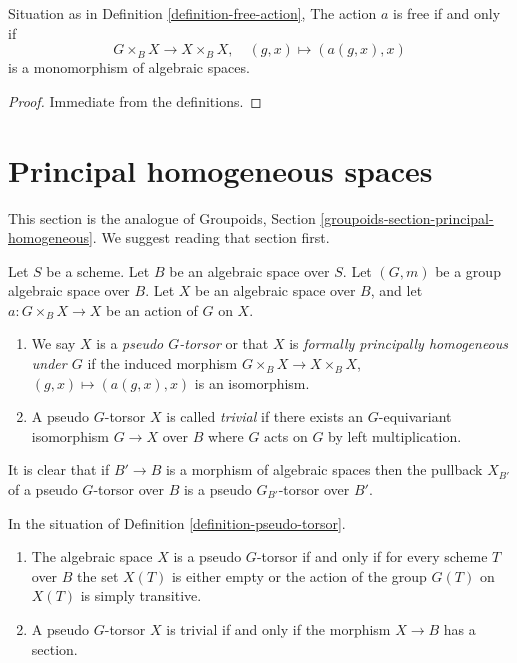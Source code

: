 \begin{lemma}
\label{lemma-free-action}
Situation as in
Definition \ref{definition-free-action},
The action $a$ is free if and only if
$$
G \times_B X \to X \times_B X,\quad (g, x) \mapsto (a(g, x), x)
$$
is a monomorphism of algebraic spaces.
\end{lemma}

\begin{proof}
Immediate from the definitions.
\end{proof}









\section{Principal homogeneous spaces}
\label{section-principal-homogeneous}

\noindent
This section is the analogue of
Groupoids, Section \ref{groupoids-section-principal-homogeneous}.
We suggest reading that section first.

\begin{definition}
\label{definition-pseudo-torsor}
Let $S$ be a scheme. Let $B$ be an algebraic space over $S$.
Let $(G, m)$ be a group algebraic space over $B$.
Let $X$ be an algebraic space over $B$, and let
$a : G \times_B X \to X$ be an action of $G$ on $X$.
\begin{enumerate}
\item We say $X$ is a {\it pseudo $G$-torsor} or that $X$ is
{\it formally principally homogeneous under $G$} if the induced
morphism $G \times_B X \to X \times_B X$,
$(g, x) \mapsto (a(g, x), x)$ is an isomorphism.
\item A pseudo $G$-torsor $X$ is called {\it trivial} if there exists
an $G$-equivariant isomorphism $G \to X$ over $B$ where $G$ acts on
$G$ by left multiplication.
\end{enumerate}
\end{definition}

\noindent
It is clear that if $B' \to B$ is a morphism of algebraic spaces then
the pullback $X_{B'}$ of a pseudo $G$-torsor over $B$ is a
pseudo $G_{B'}$-torsor over $B'$.

\begin{lemma}
\label{lemma-characterize-trivial-pseudo-torsors}
In the situation of
Definition \ref{definition-pseudo-torsor}.
\begin{enumerate}
\item The algebraic space $X$ is a pseudo $G$-torsor if and only if for
every scheme $T$ over $B$ the set $X(T)$ is either empty or the action
of the group $G(T)$ on $X(T)$ is simply transitive.
\item A pseudo $G$-torsor $X$ is trivial if and only if the morphism
$X \to B$ has a section.
\end{enumerate}
\end{lemma}

